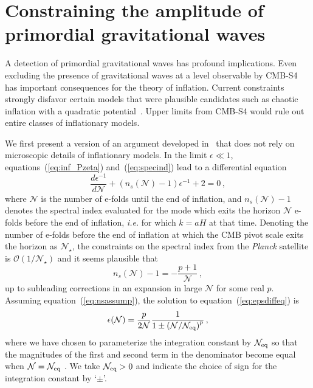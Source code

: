 \section{Constraining the amplitude of primordial gravitational waves} 
\label{sec:upperLimits}
A detection of primordial gravitational waves has profound implications. Even excluding the presence of gravitational waves at a level observable by CMB-S4 has important consequences for the theory of inflation. Current constraints strongly disfavor certain models that were plausible candidates such as chaotic inflation with a quadratic potential~\cite{bicepkeckplanck15}. Upper limits from CMB-S4 would rule out entire classes of inflationary models. 

We first present a version of an argument developed in~\cite{Mukhanov:2013tua,Roest:2013fha,Creminelli:2014nqa} that does not rely on microscopic details of inflationary models. In the limit $\epsilon\ll1$, equations~(\ref{eq:inf_Pzeta}) and~(\ref{eq:specind}) lead to a differential equation
\begin{equation}\label{eq:epsdiffeq}
\frac{d\epsilon^{-1}}{d\mathcal{N}}+(n_s(\mathcal{N})-1)\epsilon^{-1}+2=0\,,
\end{equation} 
where $\mathcal{N}$ is the number of e-folds until the end of inflation, and $n_s(\mathcal{N})-1$ denotes the spectral index evaluated for the mode which exits the horizon $\mathcal{N}$ e-folds before the end of inflation, {\it i.e.} for which $k=aH$ at that time. Denoting the number of e-folds before the end of inflation at which the CMB pivot scale exits the horizon as $\mathcal{N}_\star$, the constraints on the spectral index from the {\it Planck} satellite is $\mathcal{O}(1/\mathcal{N}_\star)$  and it seems plausible that 
\begin{equation}\label{eq:nsassump}
n_s(\mathcal{N})-1=-\frac{p+1}{\mathcal{N}}\,,
\end{equation}
up to subleading corrections in an expansion in large $\mathcal{N}$ for some real $p$. Assuming equation~(\ref{eq:nsassump}), the solution to equation~(\ref{eq:epsdiffeq}) is
\begin{equation}\label{eq:epssol}
\epsilon(\mathcal{N})=\frac{p}{2\mathcal{N}}\frac{1}{1\pm\left(\mathcal{N}/\mathcal{N}_{\rm eq}\right)^{p}}\,,
\end{equation}
where we have chosen to parameterize the integration constant by $\mathcal{N}_{\rm eq}$ so that the magnitudes of the first and second term in the denominator become equal when $\mathcal{N}=\mathcal{N}_{\rm eq}$ . We take $\mathcal{N}_{\rm eq}>0$ and indicate the choice of sign for the integration constant by `$\pm$'. 

